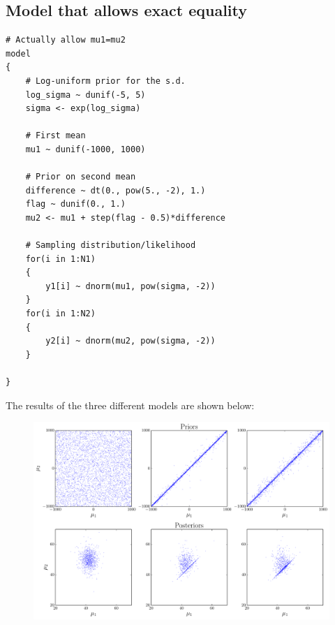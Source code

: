 \subsection{Model that allows exact equality}

\begin{framed}
\begin{verbatim}
# Actually allow mu1=mu2
model
{
    # Log-uniform prior for the s.d.
    log_sigma ~ dunif(-5, 5)
    sigma <- exp(log_sigma)

    # First mean
    mu1 ~ dunif(-1000, 1000)

    # Prior on second mean
    difference ~ dt(0., pow(5., -2), 1.)
    flag ~ dunif(0., 1.)
    mu2 <- mu1 + step(flag - 0.5)*difference

    # Sampling distribution/likelihood
    for(i in 1:N1)
    {
        y1[i] ~ dnorm(mu1, pow(sigma, -2))
    }
    for(i in 1:N2)
    {
        y2[i] ~ dnorm(mu2, pow(sigma, -2))
    }

}
\end{verbatim}
\end{framed}

The results of the three different models are shown below:
\begin{figure}
\begin{center}
\includegraphics[scale=0.6]{Figures/ttest.pdf}
\end{center}
\end{figure}


